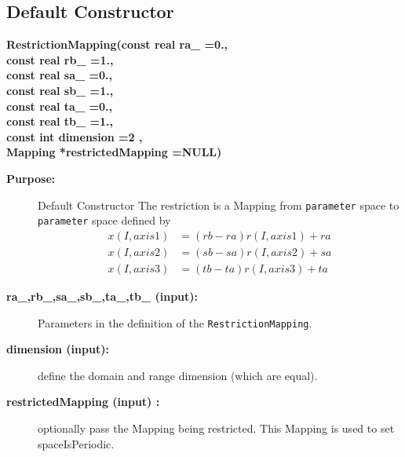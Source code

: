 \subsection{Default Constructor}
 
\newlength{\RestrictionMappingIncludeArgIndent}
\begin{flushleft} \textbf{%
\settowidth{\RestrictionMappingIncludeArgIndent}{RestrictionMapping(}%
RestrictionMapping(const real ra\_   =0.,\\ 
\hspace{\RestrictionMappingIncludeArgIndent}const real rb\_   =1.,\\ 
\hspace{\RestrictionMappingIncludeArgIndent}const real sa\_   =0.,\\ 
\hspace{\RestrictionMappingIncludeArgIndent}const real sb\_   =1.,\\ 
\hspace{\RestrictionMappingIncludeArgIndent}const real ta\_   =0.,\\ 
\hspace{\RestrictionMappingIncludeArgIndent}const real tb\_   =1.,\\ 
\hspace{\RestrictionMappingIncludeArgIndent}const int dimension  =2 ,\\ 
\hspace{\RestrictionMappingIncludeArgIndent}Mapping *restrictedMapping  =NULL)
}\end{flushleft}
\begin{description}
\item[{\bf Purpose:}]  Default Constructor
 The restriction is a Mapping from {\tt parameter} space to {\tt parameter} space
  defined by 
 \begin{align*}
     x(I,axis1) &= (rb-ra) r(I,axis1)+ra \\
     x(I,axis2) &= (sb-sa) r(I,axis2)+sa \\
     x(I,axis3) &= (tb-ta) r(I,axis3)+ta  
 \end{align*}
\item[{\bf ra\_,rb\_,sa\_,sb\_,ta\_,tb\_ (input):}]  Parameters in the definition of the 
   {\tt RestrictionMapping}.
\item[{\bf dimension (input):}]  define the domain and range dimension (which are equal).
\item[{\bf restrictedMapping (input) :}]  optionally pass the Mapping being restricted. 
  This Mapping is used to set spaceIsPeriodic.
\end{description}
